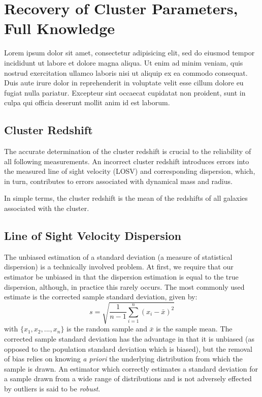 \documentclass[apj, revtex4]{emulateapj}
\begin{document}
\section{Recovery of Cluster Parameters, Full Knowledge}
Lorem ipsum dolor sit amet, consectetur adipisicing elit, sed do eiusmod tempor incididunt ut labore et dolore magna aliqua. Ut enim ad minim veniam, quis nostrud exercitation ullamco laboris nisi ut aliquip ex ea commodo consequat. Duis aute irure dolor in reprehenderit in voluptate velit esse cillum dolore eu fugiat nulla pariatur. Excepteur sint occaecat cupidatat non proident, sunt in culpa qui officia deserunt mollit anim id est laborum.

\subsection{Cluster Redshift}
The accurate determination of the cluster redshift is crucial to the reliability of all following measurements. An incorrect cluster redshift introduces errors into the measured line of sight velocity (LOSV) and corresponding dispersion, which, in turn, contributes to errors associated with dynamical mass and radius. 

In simple terms, the cluster redshift is the mean of the redshifts of all galaxies associated with the cluster. 

\subsection{Line of Sight Velocity Dispersion}
The unbiased estimation of a standard deviation (a measure of statistical dispersion) is a technically involved problem. At first, we require that our estimator be unbiased in that the dispersion estimation is equal to the true dispersion, although, in practice this rarely occurs. The most commonly used estimate is the corrected sample standard deviation, given by:
\begin{equation}
	s = \sqrt{\frac{1}{n-1} \sum_{i=1}^n (x_i - \bar{x})^2}
\end{equation}
with $\{x_1, x_2, ..., x_n\}$ is the random sample and $\bar{x}$ is the sample mean. The corrected sample standard deviation has the advantage in that it is unbiased (as opposed to the population standard deviation which is biased), but the removal of bias relies on knowing \textit{a priori} the underlying distribution from which the sample is drawn. An estimator which correctly estimates a standard deviation for a sample drawn from a wide range of distributions and is not adversely effected by outliers is said to be \textit{robust}.
\end{document}
